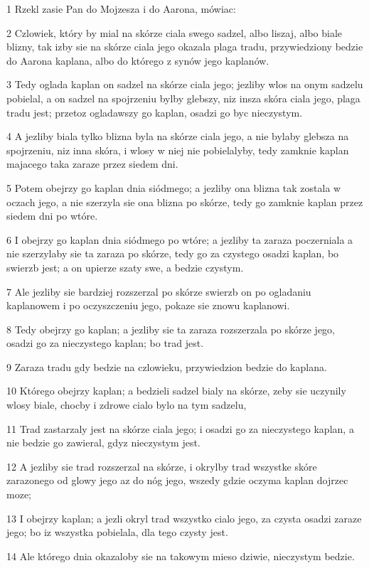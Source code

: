 \par 1 Rzekl zasie Pan do Mojzesza i do Aarona, mówiac:
\par 2 Czlowiek, który by mial na skórze ciala swego sadzel, albo liszaj, albo biale blizny, tak izby sie na skórze ciala jego okazala plaga tradu, przywiedziony bedzie do Aarona kaplana, albo do którego z synów jego kaplanów.
\par 3 Tedy oglada kaplan on sadzel na skórze ciala jego; jezliby wlos na onym sadzelu pobielal, a on sadzel na spojrzeniu bylby glebszy, niz insza skóra ciala jego, plaga tradu jest; przetoz ogladawszy go kaplan, osadzi go byc nieczystym.
\par 4 A jezliby biala tylko blizna byla na skórze ciala jego, a nie bylaby glebsza na spojrzeniu, niz inna skóra, i wlosy w niej nie pobielalyby, tedy zamknie kaplan majacego taka zaraze przez siedem dni.
\par 5 Potem obejrzy go kaplan dnia siódmego; a jezliby ona blizna tak zostala w oczach jego, a nie szerzyla sie ona blizna po skórze, tedy go zamknie kaplan przez siedem dni po wtóre.
\par 6 I obejrzy go kaplan dnia siódmego po wtóre; a jezliby ta zaraza poczerniala a nie szerzylaby sie ta zaraza po skórze, tedy go za czystego osadzi kaplan, bo swierzb jest; a on upierze szaty swe, a bedzie czystym.
\par 7 Ale jezliby sie bardziej rozszerzal po skórze swierzb on po ogladaniu kaplanowem i po oczyszczeniu jego, pokaze sie znowu kaplanowi.
\par 8 Tedy obejrzy go kaplan; a jezliby sie ta zaraza rozszerzala po skórze jego, osadzi go za nieczystego kaplan; bo trad jest.
\par 9 Zaraza tradu gdy bedzie na czlowieku, przywiedzion bedzie do kaplana.
\par 10 Którego obejrzy kaplan; a bedzieli sadzel bialy na skórze, zeby sie uczynily wlosy biale, chocby i zdrowe cialo bylo na tym sadzelu,
\par 11 Trad zastarzaly jest na skórze ciala jego; i osadzi go za nieczystego kaplan, a nie bedzie go zawieral, gdyz nieczystym jest.
\par 12 A jezliby sie trad rozszerzal na skórze, i okrylby trad wszystke skóre zarazonego od glowy jego az do nóg jego, wszedy gdzie oczyma kaplan dojrzec moze;
\par 13 I obejrzy kaplan; a jezli okryl trad wszystko cialo jego, za czysta osadzi zaraze jego; bo iz wszystka pobielala, dla tego czysty jest.
\par 14 Ale którego dnia okazaloby sie na takowym mieso dziwie, nieczystym bedzie.
